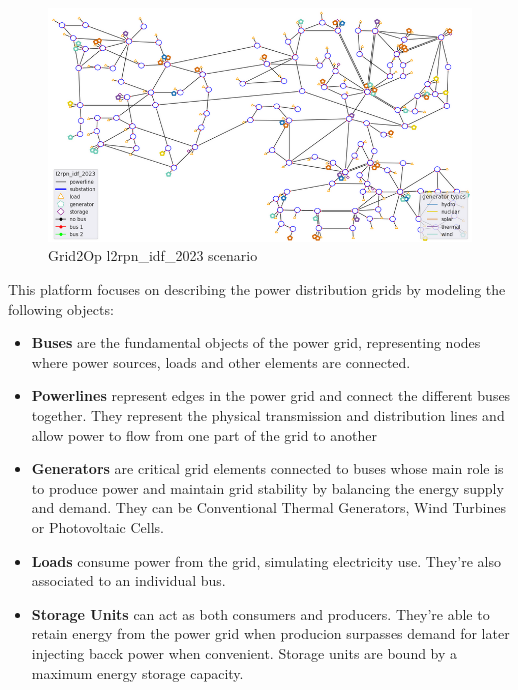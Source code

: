 \begin{figure}
	\centering
	\includegraphics[width=0.85\linewidth]{./figures/grid2op-graph.png}
	\caption{Grid2Op l2rpn\_idf\_2023 scenario \cite{rtefranceGrid2OpDocumentation}}
	\label{fig:grid2op-graph}
\end{figure}

This platform focuses on describing the power distribution grids by modeling the following objects:
\begin{itemize}
	\item \textbf{Buses} are the fundamental objects of the power grid, representing nodes where power sources, loads and other elements are connected.
	
	\item \textbf{Powerlines} represent edges in the power grid and connect the different buses together. They represent the physical transmission and distribution lines and allow power to flow from one part of the grid to another
	
	\item \textbf{Generators} are critical grid elements connected to buses whose main role is to produce power and maintain grid stability by balancing the energy supply and demand. They can be Conventional Thermal Generators, Wind Turbines or Photovoltaic Cells.
	
	\item \textbf{Loads} consume power from the grid, simulating electricity use. They're also associated to an individual bus.
	
	\item \textbf{Storage Units} can act as both consumers and producers. They're able to retain energy from the power grid when producion surpasses demand for later injecting bacck power when convenient. Storage units are bound by a maximum energy storage capacity.
\end{itemize}


